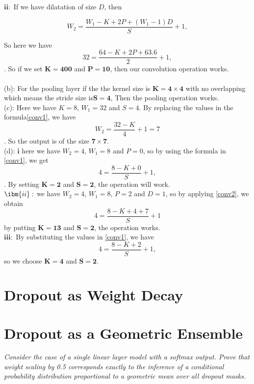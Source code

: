 \documentclass{amsart}
\theoremstyle{definition}
\theoremstyle{remark}
\numberwithin{equation}{section}
\begin{document}
$\bm{ii}:$ If we have dilatation of size $D$, then

\begin{equation}\label{conv2}
W_2= \frac{W_1-K+2P+(W_1-1)D}{S}+1,
\end{equation}

So here we have $$32= \frac{64-K+2P+63.6}{2}+1,$$. So if we set $\bm{K=400}$ and
$\bm{P=10}$, then our convolution operation works.\\\\

(b): For the pooling layer if the the kernel size is $\bm{K=4\times4}$ with no
overlapping which means the stride size is$\bm{S=4}$, Then the pooling operation
works.\\

(c): Here we have $K=8$, $W_1=32$ and $S=4$. By replacing the values in the
formula\eqref{conv1}, we have $$W_2= \frac{32-K}{4}+1=7$$. So the output is of
the size $\bm{7\times7}.$ \\

(d): $\bm{i}$ here we have $W_2=4$, $W_1=8$ and $P=0$, so by using the formula
in \eqref{conv1}, we get $$4=\frac{8-K+0}{S}+1,$$. By setting $\bm{K=2}$ and
$\bm{S=2}$, the operation will work. \\

$\ibm{ii}:$ we have $W_2=4$, $W_1=8$, $P=2$
and $D=1$, so by applying \eqref{conv2}, we obtain $$4= \frac{8-K+4+7}{S}+1$$
by putting $\bm{K=13}$ and $\bm{S=2}$, the operation works.\\

$\bm{iii}:$ By substituting the values in \eqref{conv1}, we have
$$4=\frac{8-K+2}{S}+1,$$ so we choose $\bm{K=4}$ and $\bm{S=2}$. \\

\section{Dropout as Weight Decay}

\section{Dropout as a Geometric Ensemble}

\textit{Consider the case of a single linear layer model with a softmax output.
Prove that weight scaling by 0.5 corresponds exactly to the inference of a
conditional probability distribution proportional to a geometric mean over all
dropout masks.} \\
\end{document}
